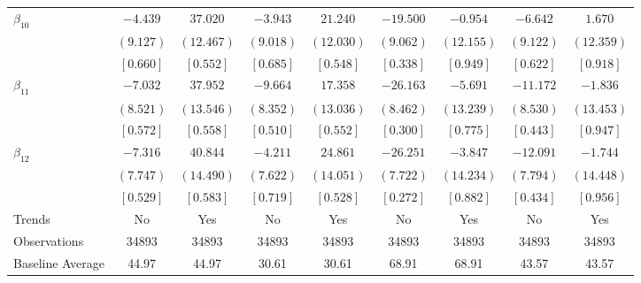 \documentclass[12pt]{article}
\begin{document}
\begin{table}[h!]
\begin{adjustbox}{width=\textwidth}
\begin{tabular}{lcccccccc}
 $\beta_{10}$  & $ -4.439$ & $ 37.020$ & $ -3.943$ & $ 21.240$ & $-19.500$ & $ -0.954$ & $ -6.642$ & $  1.670$ \\
& $(  9.127)$ & $( 12.467)$ & $(  9.018)$ & $( 12.030)$ & $(  9.062)$ & $( 12.155)$ & $(  9.122)$ & $( 12.359)$ \\
& $[  0.660]$ & $[  0.552]$ & $[  0.685]$ & $[  0.548]$ & $[  0.338]$ & $[  0.949]$ & $[  0.622]$ & $[  0.918]$ \\
 $\beta_{11}$  & $ -7.032$ & $ 37.952$ & $ -9.664$ & $ 17.358$ & $-26.163$ & $ -5.691$ & $-11.172$ & $ -1.836$ \\
& $(  8.521)$ & $( 13.546)$ & $(  8.352)$ & $( 13.036)$ & $(  8.462)$ & $( 13.239)$ & $(  8.530)$ & $( 13.453)$ \\
& $[  0.572]$ & $[  0.558]$ & $[  0.510]$ & $[  0.552]$ & $[  0.300]$ & $[  0.775]$ & $[  0.443]$ & $[  0.947]$ \\
 $\beta_{12}$  & $ -7.316$ & $ 40.844$ & $ -4.211$ & $ 24.861$ & $-26.251$ & $ -3.847$ & $-12.091$ & $ -1.744$ \\
& $(  7.747)$ & $( 14.490)$ & $(  7.622)$ & $( 14.051)$ & $(  7.722)$ & $( 14.234)$ & $(  7.794)$ & $( 14.448)$ \\
& $[  0.529]$ & $[  0.583]$ & $[  0.719]$ & $[  0.528]$ & $[  0.272]$ & $[  0.882]$ & $[  0.434]$ & $[  0.956]$ \\
\bottomrule
Trends & No & Yes & No & Yes & No & Yes & No & Yes \\
Observations & 34893 & 34893 & 34893 & 34893 & 34893 & 34893 & 34893 & 34893 \\
Baseline Average & 44.97 & 44.97 & 30.61 & 30.61 & 68.91 & 68.91 & 43.57 & 43.57 \\
\bottomrule
\end{tabular}
\end{adjustbox}
\end{table}
\end{document}
